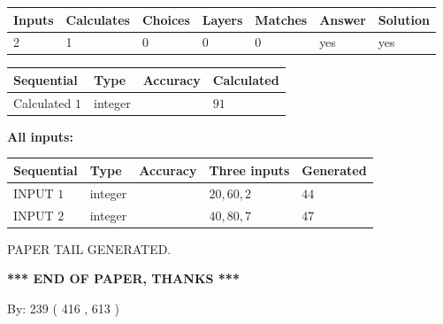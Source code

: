 \documentclass{ctexart}
\begin{document}
   
\noindent\begin{tabular}{|l|l|l|l|l|l|l|}
 \hline
Inputs & Calculates & Choices & Layers & Matches & Answer & Solution \\ \hline
 2  & 
 1  & 
 0
  & 
 0  & 
 0  & 
  yes & 
  yes 
  \\ \hline
 \end{tabular}
   
   
   
   
\noindent{}
   
   
  
  
\noindent\begin{tabular}{|l|l|l|l|}
\hline
 Sequential & Type & Accuracy & Calculated \\ 
\hline
 
 
  Calculated $  1 $ & integer &  & 
  $ 91 $ 
 \\  \hline  
 \end{tabular}
   
   
   
   
\noindent\vspace{0.1in}\hspace{-0.08in} {\textbf{\Large{All inputs: }}}
   
   
  
  
\noindent\begin{tabular}{|l|l|l|l|l|}
\hline
 Sequential & Type & Accuracy & Three inputs & Generated \\ 
\hline
 
 
  INPUT $  1 $ & integer &  & $
 20
 , 
 60
 , 
 2
 $ & $ 44 $ 
 \\  \hline  
 
 
  INPUT $  2 $ & integer &  & $
 40
 , 
 80
 , 
 7
 $ & $ 47 $ 
 \\  \hline  
 \end{tabular}
   
   
   
   
   
   
 \vspace{0.2in}
 
   
   
\vspace{2.0in} PAPER TAIL GENERATED.
   
   
   
   
\vspace{1.0in} 
{\textbf{\large{ *** END OF PAPER, THANKS *** }}} 
   
   
\hspace{1.0in} By: 
 239 ( 416 ,  613 )
   
\end{document}
